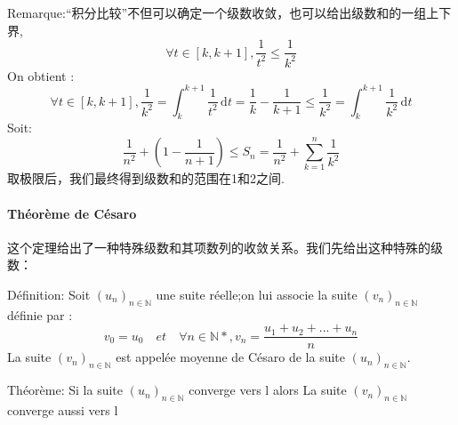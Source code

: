 \documentclass[12pt]{book}
\theoremstyle{definition}\newtheorem{dfn}{Définition}[chapter]
\theoremstyle{plain}\newtheorem{thm}{Théorème}[chapter]
\theoremstyle{plain}\newtheorem{prp}{Proposition}[chapter]
\theoremstyle{plain}\newtheorem{lem}{\bf Lemme}[chapter]
\theoremstyle{plain}\newtheorem{axm}{\bf Axiome}[chapter]
\theoremstyle{plain}\newtheorem{lmm}{\bf Lemme}[chapter]
\theoremstyle{plain}\newtheorem{cor}{\bf Corollaire}[chapter]
\theoremstyle{remark}\newtheorem{rem}{Remarque}[chapter]
\begin{document}
Remarque:“积分比较”不但可以确定一个级数收敛，也可以给出级数和的一组上下界,
$$
\forall t \in [k,k+1], \frac{1}{t^2} \leqslant \frac{1}{k^2}
$$
On obtient :
\begin{equation*}
\forall t \in [k,k+1],
\frac{1}{k^2} = \int_k^{k+1} \frac{1}{t^2}\,\mathrm{d}t=
\frac{1}{k}-\frac{1}{k+1}
\leqslant \frac{1}{k^2} = \int_k^{k+1} \frac{1}{k^2}\,\mathrm{d}t
\end{equation*}
Soit:
$$\frac{1}{n^{2}}+(1-\frac{1}{n+1})
\leqslant S_n=\frac{1}{n^{2}}+\sum_{k=1}^{n} {\frac{1}{k^2}}
$$
取极限后，我们最终得到级数和的范围在1和2之间.

\paragraph{Théorème de Césaro}
这个定理给出了一种特殊级数和其项数列的收敛关系。我们先给出这种特殊的级数：

Définition:  Soit $(u_n)_{n\in \mathbb{N}}$ une suite réelle;on lui associe la suite $(v_n)_{n\in \mathbb{N}}$ définie par :
$$ v_0=u_0 \quad et \quad \forall n \in \mathbb{N*}, v_n=\frac{u_1+u_2+...+u_n}{n} $$
La suite $(v_n)_{n\in \mathbb{N}}$ est appelée moyenne de Césaro de la suite $(u_n)_{n\in \mathbb{N}}$.

Théorème: Si la suite $(u_n)_{n\in \mathbb{N}}$ converge vers l alors La suite $(v_n)_{n\in \mathbb{N}}$ converge aussi vers l
\end{document}
